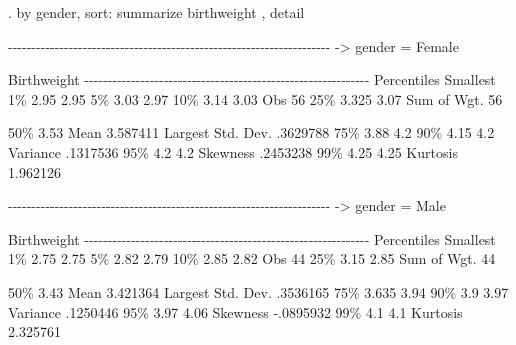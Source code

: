 \documentclass[
]{memoir}
\newenvironment{Shaded}{\begin{snugshade}}{\end{snugshade}}
\newcommand{\NormalTok}[1]{#1}
\begin{document}
\begin{Shaded}
\begin{Highlighting}[]
\NormalTok{. by gender, sort: summarize birthweight , detail}

\NormalTok{{-}{-}{-}{-}{-}{-}{-}{-}{-}{-}{-}{-}{-}{-}{-}{-}{-}{-}{-}{-}{-}{-}{-}{-}{-}{-}{-}{-}{-}{-}{-}{-}{-}{-}{-}{-}{-}{-}{-}{-}{-}{-}{-}{-}{-}{-}{-}{-}{-}{-}{-}{-}{-}{-}{-}{-}{-}{-}{-}{-}{-}{-}{-}{-}{-}{-}{-}{-}{-}}
\NormalTok{{-}\textgreater{} gender = Female}

\NormalTok{                         Birthweight}
\NormalTok{{-}{-}{-}{-}{-}{-}{-}{-}{-}{-}{-}{-}{-}{-}{-}{-}{-}{-}{-}{-}{-}{-}{-}{-}{-}{-}{-}{-}{-}{-}{-}{-}{-}{-}{-}{-}{-}{-}{-}{-}{-}{-}{-}{-}{-}{-}{-}{-}{-}{-}{-}{-}{-}{-}{-}{-}{-}{-}{-}{-}{-}}
\NormalTok{      Percentiles      Smallest}
\NormalTok{ 1\%         2.95           2.95}
\NormalTok{ 5\%         3.03           2.97}
\NormalTok{10\%         3.14           3.03       Obs                  56}
\NormalTok{25\%        3.325           3.07       Sum of Wgt.          56}

\NormalTok{50\%         3.53                      Mean           3.587411}
\NormalTok{                        Largest       Std. Dev.      .3629788}
\NormalTok{75\%         3.88            4.2}
\NormalTok{90\%         4.15            4.2       Variance       .1317536}
\NormalTok{95\%          4.2            4.2       Skewness       .2453238}
\NormalTok{99\%         4.25           4.25       Kurtosis       1.962126}

\NormalTok{{-}{-}{-}{-}{-}{-}{-}{-}{-}{-}{-}{-}{-}{-}{-}{-}{-}{-}{-}{-}{-}{-}{-}{-}{-}{-}{-}{-}{-}{-}{-}{-}{-}{-}{-}{-}{-}{-}{-}{-}{-}{-}{-}{-}{-}{-}{-}{-}{-}{-}{-}{-}{-}{-}{-}{-}{-}{-}{-}{-}{-}{-}{-}{-}{-}{-}{-}{-}{-}}
\NormalTok{{-}\textgreater{} gender = Male}

\NormalTok{                         Birthweight}
\NormalTok{{-}{-}{-}{-}{-}{-}{-}{-}{-}{-}{-}{-}{-}{-}{-}{-}{-}{-}{-}{-}{-}{-}{-}{-}{-}{-}{-}{-}{-}{-}{-}{-}{-}{-}{-}{-}{-}{-}{-}{-}{-}{-}{-}{-}{-}{-}{-}{-}{-}{-}{-}{-}{-}{-}{-}{-}{-}{-}{-}{-}{-}}
\NormalTok{      Percentiles      Smallest}
\NormalTok{ 1\%         2.75           2.75}
\NormalTok{ 5\%         2.82           2.79}
\NormalTok{10\%         2.85           2.82       Obs                  44}
\NormalTok{25\%         3.15           2.85       Sum of Wgt.          44}

\NormalTok{50\%         3.43                      Mean           3.421364}
\NormalTok{                        Largest       Std. Dev.      .3536165}
\NormalTok{75\%        3.635           3.94}
\NormalTok{90\%          3.9           3.97       Variance       .1250446}
\NormalTok{95\%         3.97           4.06       Skewness      {-}.0895932}
\NormalTok{99\%          4.1            4.1       Kurtosis       2.325761}
\end{Highlighting}
\end{Shaded}
\end{document}
